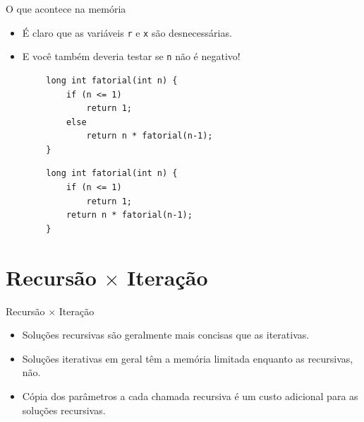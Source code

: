 \documentclass[handout]{beamer}
\newcommand{\cod}[1]{\texttt{#1}}
\begin{document}
\begin{frame}[fragile]{O que acontece na memória}

    \begin{itemize}
        \item É claro que as variáveis \cod{r} e \cod{x} são desnecessárias.
        \item E você também deveria testar se \cod{n} não é negativo!
    \end{itemize}

    \begin{verbatim}
        long int fatorial(int n) {
            if (n <= 1)
                return 1;
            else
                return n * fatorial(n-1);
        }
    \end{verbatim}

    \pause

    \begin{verbatim}
        long int fatorial(int n) {
            if (n <= 1)
                return 1;
            return n * fatorial(n-1);
        }
    \end{verbatim}
\end{frame}


\section{Recursão $\times$ Iteração}

\begin{frame}[fragile]{Recursão $\times$ Iteração}

    \begin{itemize}[<+->]
        \item Soluções recursivas são geralmente mais concisas que as iterativas.
        \item Soluções iterativas em geral têm a memória limitada enquanto as recursivas, não.
        \item Cópia dos parâmetros a cada chamada recursiva é um custo adicional para as soluções recursivas.
    \end{itemize}
\end{frame}
\end{document}

